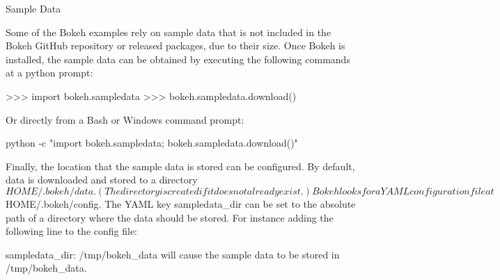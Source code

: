 Sample Data


Some of the Bokeh examples rely on sample data that is not included in the Bokeh GitHub repository or released packages, due to their size. Once Bokeh is installed, the sample data can be obtained by executing the following commands at a python prompt:

>>> import bokeh.sampledata
>>> bokeh.sampledata.download()

Or directly from a Bash or Windows command prompt:

python -c "import bokeh.sampledata; bokeh.sampledata.download()"


Finally, the location that the sample data is stored can be configured. By default, data is downloaded and stored to a directory $HOME/.bokeh/data. (The directory is created if it does not already exist.) Bokeh looks for a YAML configuration file at $HOME/.bokeh/config. The YAML key sampledata_dir can be set to the absolute path of a directory where the data should be stored. For instance adding the following line to the config file:

sampledata_dir: /tmp/bokeh_data
will cause the sample data to be stored in /tmp/bokeh_data.

